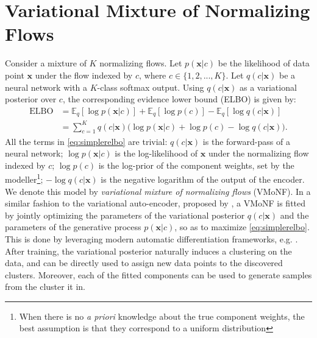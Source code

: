 \section{Variational Mixture of Normalizing Flows}
\label{section:vmonf}
Consider a mixture of $K$ normalizing flows. Let $p(\bm{x} | c)$ be the likelihood
of data point $\bm{x}$ under the flow indexed by $c$, where $c \in \{1, 2, ..., K\}$.
Let $q(c|\bm{x})$ be a neural network with a $K$-class softmax output. Using $q(c|\bm{x})$
as a variational posterior over $c$, the corresponding evidence lower bound (ELBO) is given by:
\begin{align}
    \text{ELBO} &= \mathbb{E}_q [\log p(\bm{x}|c)] + \mathbb{E}_q [\log p(c)] - \mathbb{E}_q [\log q(c|\bm{x})]
        \label{eq:threepartelbo} \\
    &= \sum_{c=1}^K q(c|\bm{x})\big(\log p(\bm{x}|c) + \log p(c) - \log q(c|\bm{x})\big). \label{eq:simplerelbo}
\end{align}
All the terms in \eqref{eq:simplerelbo} are trivial: $q(c|\bm{x})$ is the
forward-pass of a neural network; $\log p(\bm{x}|c)$ is the log-likelihood of $\bm{x}$
under the normalizing flow indexed by $c$; $\log p(c)$ is the log-prior of the
component weights, set by the modeller\footnote{When there is no \emph{a priori}
knowledge about the true component weights, the best assumption is that they
correspond to a uniform distribution}; $- \log q(c|\bm{x})$ is the negative
logarithm of the output of the encoder.
We denote this model by \emph{variational mixture of normalizing flows} (VMoNF).
In a similar fashion to the variational auto-encoder, proposed by \textcite{vaepaper},
a VMoNF is fitted by jointly optimizing the parameters of the variational
posterior $q(c|\bm{x})$ and the parameters of the generative process
$p(\bm{x}|c)$, so as to maximize \eqref{eq:simplerelbo}. This is done by leveraging
modern automatic differentiation frameworks, e.g. \autocite{pytorch}.
After training, the variational posterior naturally induces a clustering on
the data, and can be directly used to assign new data points to the discovered
clusters. Moreover, each of the fitted components can be used to generate
samples from the cluster it  in.
